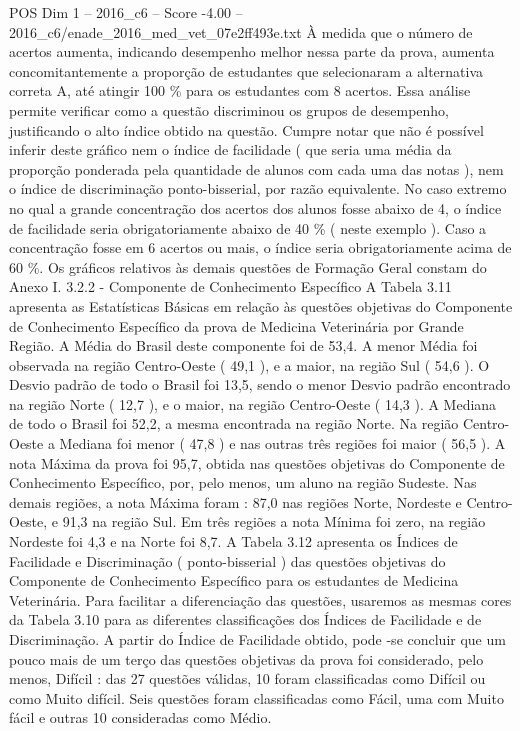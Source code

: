 \begin{textsample}{POS Dim 1 – 2016\_c6 – Score -4.00 – 2016\_c6/enade\_2016\_med\_vet\_07e2ff493e.txt}
À medida que o número de acertos aumenta, indicando desempenho melhor nessa parte da prova, aumenta concomitantemente a proporção de estudantes que selecionaram a alternativa correta A, até atingir 100 \% para os estudantes com 8 acertos.
Essa análise permite verificar como a questão discriminou os grupos de desempenho, justificando o alto índice obtido na questão.
Cumpre notar que não é possível inferir deste gráfico nem o índice de facilidade ( que seria uma média da proporção ponderada pela quantidade de alunos com cada uma das notas ), nem o índice de discriminação ponto-bisserial, por razão equivalente.
No caso extremo no qual a grande concentração dos acertos dos alunos fosse abaixo de 4, o índice de facilidade seria obrigatoriamente abaixo de 40 \% ( neste exemplo ).
Caso a concentração fosse em 6 acertos ou mais, o índice seria obrigatoriamente acima de 60 \%.
Os gráficos relativos às demais questões de Formação Geral constam do Anexo I. 3.2.2 - Componente de Conhecimento Específico A Tabela 3.11 apresenta as Estatísticas Básicas em relação às questões objetivas do Componente de Conhecimento Específico da prova de Medicina Veterinária por Grande Região.
A Média do Brasil deste componente foi de 53,4.
A menor Média foi observada na região Centro-Oeste ( 49,1 ), e a maior, na região Sul ( 54,6 ).
O Desvio padrão de todo o Brasil foi 13,5, sendo o menor Desvio padrão encontrado na região Norte ( 12,7 ), e o maior, na região Centro-Oeste ( 14,3 ).
A Mediana de todo o Brasil foi 52,2, a mesma encontrada na região Norte.
Na região Centro-Oeste a Mediana foi menor ( 47,8 ) e nas outras três regiões foi maior ( 56,5 ).
A nota Máxima da prova foi 95,7, obtida nas questões objetivas do Componente de Conhecimento Específico, por, pelo menos, um aluno na região Sudeste.
Nas demais regiões, a nota Máxima foram : 87,0 nas regiões Norte, Nordeste e Centro-Oeste, e 91,3 na região Sul.
Em três regiões a nota Mínima foi zero, na região Nordeste foi 4,3 e na Norte foi 8,7.
A Tabela 3.12 apresenta os Índices de Facilidade e Discriminação ( ponto-bisserial ) das questões objetivas do Componente de Conhecimento Específico para os estudantes de Medicina Veterinária.
Para facilitar a diferenciação das questões, usaremos as mesmas cores da Tabela 3.10 para as diferentes classificações dos Índices de Facilidade e de Discriminação.
A partir do Índice de Facilidade obtido, pode -se concluir que um pouco mais de um terço das questões objetivas da prova foi considerado, pelo menos, Difícil : das 27 questões válidas, 10 foram classificadas como Difícil ou como Muito difícil.
Seis questões foram classificadas como Fácil, uma com Muito fácil e outras 10 consideradas como Médio.

\end{textsample}
